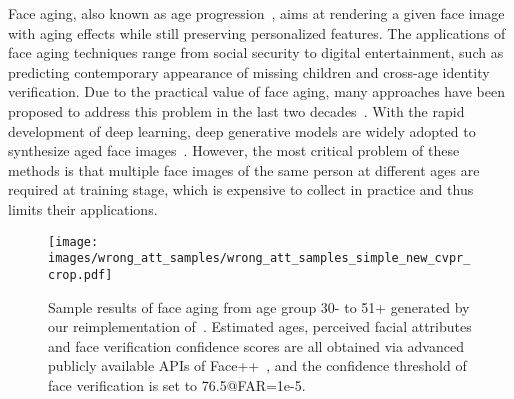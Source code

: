 \documentclass[10pt,twocolumn,letterpaper]{article}
\begin{document}
Face aging, also known as age progression~\cite{shu2015personalized}, aims at rendering a given face image with aging effects while still preserving personalized features. 
The applications of face aging techniques range from social security to digital entertainment, such as predicting contemporary appearance of missing children and cross-age identity verification. 
Due to the practical value of face aging, many approaches have been proposed to address this problem in the last two decades~\cite{lanitis2002toward,tazoe2012facial,suo2010compositional,tiddeman2001prototyping,kemelmacher2014illumination}.
With the rapid development of deep learning, deep generative models are widely adopted to synthesize aged face images~\cite{wang2016recurrent,duong2016longitudinal,duong2017temporal}. 
However, the most critical problem of these methods is that multiple face images of the same person at different ages are required at training stage, which is expensive to collect in practice and thus limits their applications. %

\begin{figure}[t]
\begin{center}
\texttt{[image: images/wrong\_att\_samples/wrong\_att\_samples\_simple\_new\_cvpr\_crop.pdf]}
\end{center}
\caption{Sample results of face aging from age group 30- to 51+ generated by our reimplementation of~\cite{yang2017learning}.
Estimated ages, perceived facial attributes and face verification confidence scores are all obtained via advanced publicly available APIs of Face++~\cite{face2018toolkit}, and the confidence threshold of face verification is set to 76.5@FAR=1e-5.}
\label{fig:faceAttIdt}
\end{figure}
\end{document}
